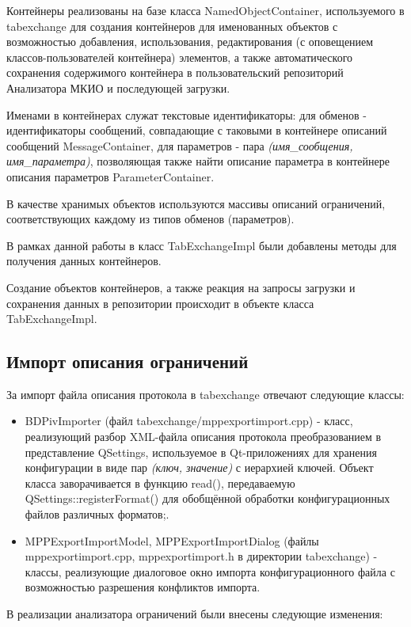 Контейнеры реализованы на базе класса NamedObjectContainer, используемого в 
tabexchange для создания контейнеров для именованных объектов с возможностью 
добавления, использования, редактирования (с оповещением классов-пользователей 
контейнера) элементов, а также автоматического сохранения содержимого 
контейнера в пользовательский репозиторий Анализатора МКИО и последующей 
загрузки.

Именами в контейнерах служат текстовые идентификаторы: для обменов - 
идентификаторы сообщений, совпадающие с таковыми в контейнере описаний 
сообщений MessageContainer, для параметров - пара \textit{(имя\_сообщения, 
имя\_параметра)}, позволяющая также найти описание параметра в 
контейнере описания параметров ParameterContainer.

В качестве хранимых объектов используются массивы описаний ограничений, 
соответствующих каждому из типов обменов (параметров).

В рамках данной работы в класс TabExchangeImpl были добавлены методы для 
получения данных контейнеров.

Создание объектов контейнеров, а также реакция на запросы загрузки и сохранения 
данных в репозитории происходит в объекте класса TabExchangeImpl.

\subsection{Импорт описания ограничений}

За импорт файла описания протокола в tabexchange отвечают следующие классы:

\begin{itemize}
 \item BDPivImporter (файл tabexchange/mppexportimport.cpp) - класс, 
реализующий разбор XML-файла описания протокола преобразованием в представление 
QSettings, используемое в Qt-приложениях для хранения конфигурации в виде пар 
\textit{(ключ, значение)} с иерархией ключей. Объект класса заворачивается в 
функцию read(), передаваемую QSettings::registerFormat() для обобщённой 
обработки конфигурационных файлов различных форматов;.
 \item MPPExportImportModel, MPPExportImportDialog (файлы 
mppexportimport.cpp, mppexportimport.h в директории tabexchange) - классы, 
реализующие диалоговое окно импорта конфигурационного файла с возможностью 
разрешения конфликтов импорта.
\end{itemize}

В реализации анализатора ограничений были внесены следующие изменения:


